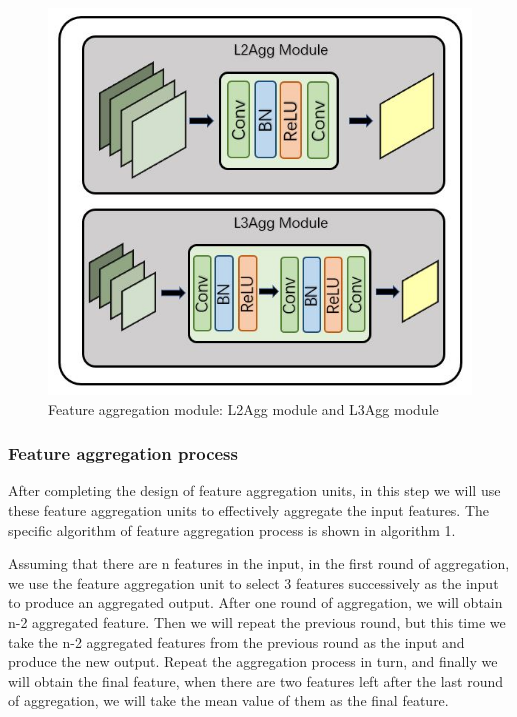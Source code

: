 \documentclass[10pt,twocolumn,letterpaper]{article}
\begin{document}
\begin{figure}[t]
\begin{center}
  \includegraphics[width=0.8\linewidth]{figure5.JPG}
\end{center}
   \caption{Feature aggregation module: L2Agg module and L3Agg module }
\label{fig:long}
\label{fig:onecol}
\end{figure}


\subsubsection{Feature aggregation process}
After completing the design of feature aggregation units, in this step we will use these feature aggregation units to effectively aggregate the input features. The specific algorithm of feature aggregation process is shown in algorithm 1.

Assuming that there are n features in the input, in the first round of aggregation, we use the feature aggregation unit to select 3 features successively as the input to produce an aggregated output. After one round of aggregation, we will obtain n-2 aggregated feature. Then we will repeat the previous round, but this time we take the n-2 aggregated features from the previous round as the input and produce the new output. Repeat the aggregation process in turn, and finally we will obtain the final feature, when there are two features left after the last round of aggregation, we will take the mean value of them as the final feature.
\end{document}
